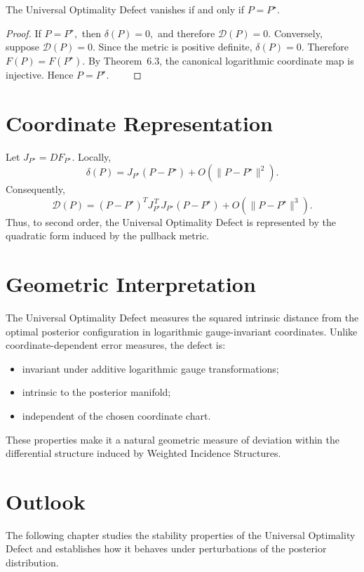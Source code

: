\begin{proposition}
\label{ch:prop:8-5}
The Universal Optimality Defect vanishes if and only if
$P=P^\star.$
\end{proposition}
\begin{proof}
If
$P=P^\star,$
then
$\delta(P)=0,$
and therefore
$\mathcal D(P)=0.$
Conversely, suppose
$\mathcal D(P)=0.$
Since the metric is positive definite,
$\delta(P)=0.$
Therefore
$F(P)=F(P^\star).$
By Theorem~6.3, the canonical logarithmic coordinate map is injective.
Hence
$P=P^\star. \qquad$
\end{proof}
\section{Coordinate Representation}
Let
$J_{P^\star}=DF_{P^\star}.$
Locally,
\[
\delta(P)
=
J_{P^\star}(P-P^\star)
+
O(\|P-P^\star\|^2).
\]
Consequently,
\[
\mathcal D(P)
=
(P-P^\star)^T
J_{P^\star}^{\,T}
J_{P^\star}
(P-P^\star)
+
O(\|P-P^\star\|^3).
\]
Thus, to second order, the Universal Optimality Defect is represented by the quadratic form induced by the pullback metric.
\section{Geometric Interpretation}
The Universal Optimality Defect measures the squared intrinsic distance from the optimal posterior configuration in logarithmic gauge-invariant coordinates.
Unlike coordinate-dependent error measures, the defect is:
\begin{itemize}
\item invariant under additive logarithmic gauge transformations;
\item intrinsic to the posterior manifold;
\item independent of the chosen coordinate chart.
\end{itemize}
These properties make it a natural geometric measure of deviation within the differential structure induced by Weighted Incidence Structures.
\section{Outlook}
The following chapter studies the stability properties of the Universal Optimality Defect and establishes how it behaves under perturbations of the posterior distribution.

